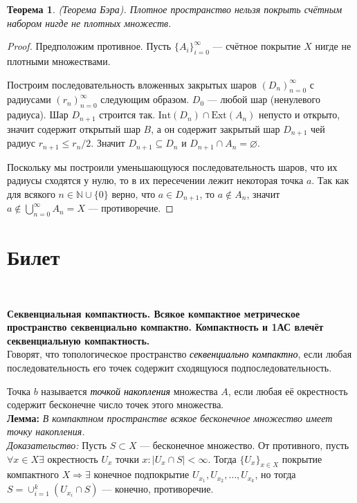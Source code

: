 \documentclass[a4paper,100pt]{article}
\theoremstyle{indented}
\newtheorem{theorem}{Теорема}
\begin{document}
\begin{theorem}
    (Теорема Бэра). Плотное пространство нельзя покрыть счётным набором нигде не плотных множеств.
\end{theorem}

\begin{proof}
    Предположим противное. Пусть $\{A_i\}_{i=0}^\infty$ --- счётное покрытие $X$ нигде не плотными множествами.

    Построим последовательность вложенных закрытых шаров $(D_n)_{n=0}^\infty$ с радиусами $(r_n)_{n=0}^\infty$ следующим образом. $D_0$ --- любой шар (ненулевого радиуса). Шар $D_{n+1}$ строится так. $\text{Int}(D_n) \cap \text{Ext}(A_n)$ непусто и открыто, значит содержит открытый шар $B$, а он содержит закрытый шар $D_{n+1}$ чей радиус $r_{n+1} \leqslant r_n/2$. Значит $D_{n+1} \subseteq D_n$ и $D_{n+1} \cap A_n = \varnothing$.
        
    Поскольку мы построили уменьшающуюся последовательность шаров, что их радиусы сходятся у нулю, то в их пересечении лежит некоторая точка $a$. Так как для всякого $n \in \mathbb{N} \cup \{0\}$ верно, что $a \in D_{n+1}$, то $a \notin A_n$, значит $a \notin \bigcup_{n=0}^\infty A_n = X$ --- противоречие.
\end{proof}


\section{Билет} \

\medskip

\textbf{Секвенциальная компактность. Всякое компактное метрическое пространство секвенциально компактно. Компактность и 1АС влечёт секвенциальную компактность.}\\
     
     Говорят, что топологическое пространство \textit{\textcolor{black}{секвенциально компактно}}, если любая последовательность его точек содержит сходящуюся подпоследовательность.
     
     Точка $b$ называется \textit{\textcolor{black}{точкой накопления}} множества $A$, если любая её окрестность содержит бесконечне число точек этого множества.\\
     
     \textbf{Лемма:}
     \textit{В компактном пространстве всякое бесконечное множество имеет точку накопления.}\\
     
     \textit{Доказательство:} Пусть $S \subset X$ --- бесконечное множество. От противного, пусть $\forall x \in X \exists$ окрестность $U_x$ точки $x: |U_x \cap S| < \infty$. Тогда $\{U_x\}_{x \in X}$ покрытие компактного $X \Rightarrow \exists$ конечное подпокрытие $U_{x_1}, U_{x_2}, \dots, U_{x_k}$, но тогда $S = \cup_{i = 1}^k(U_{x_i} \cap S)$ --- конечно, противоречие.\\
     
\end{document}
